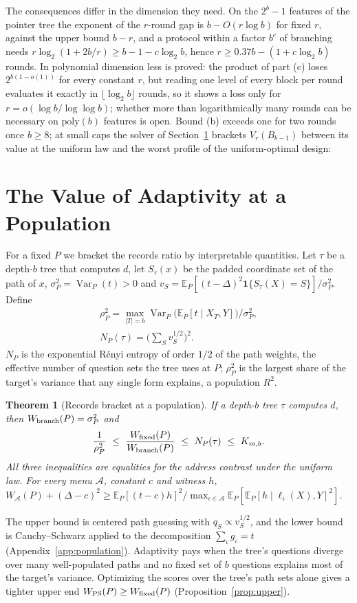 \documentclass{article}
\newtheorem{theorem}{Theorem}
\newcommand{\E}{\mathbb{E}}
\newcommand{\Var}{\operatorname{Var}}
\newcommand{\A}{\mathcal A}
\begin{document}
The consequences differ in the dimension they need. On the $2^b-1$ features of the pointer tree the exponent of the $r$-round gap is $b-O(r\log b)$ for fixed $r$, against the upper bound $b-r$, and a protocol within a factor $b^c$ of branching needs $r\log_2(1+2b/r)\ge b-1-c\log_2b$, hence $r\ge0.37b-(1+c\log_2b)$ rounds. In polynomial dimension less is proved: the product of part (c) loses $2^{b(1-o(1))}$ for every constant $r$, but reading one level of every block per round evaluates it exactly in $\lfloor\log_2b\rfloor$ rounds, so it shows a loss only for $r=o(\log b/\log\log b)$; whether more than logarithmically many rounds can be necessary on $\mathrm{poly}(b)$ features is open. Bound (b) exceeds one for two rounds once $b\ge8$; at small caps the solver of Section~\ref{sec:population} brackets $V_r(B_{b-1})$ between its value at the uniform law and the worst profile of the uniform-optimal design: \nPointerSentence{}

\section{The Value of Adaptivity at a Population}\label{sec:population}
For a fixed $P$ we bracket the records ratio by interpretable quantities. Let $\tau$ be a depth-$b$ tree that computes $d$, let $S_\tau(x)$ be the padded coordinate set of the path of $x$, $\sigma_P^2=\Var_P(t)>0$ and $v_S=\E_P[(t-\Delta)^2\mathbf 1\{S_\tau(X)=S\}]/\sigma_P^2$. Define
\begin{gather*}
 \rho_P^2=\max_{|T|=b}\Var_P\big(\E_P[t\mid X_T,Y]\big)\big/\sigma_P^2,\\
 N_P(\tau)=\Big(\sum\nolimits_Sv_S^{1/2}\Big)^2.
\end{gather*}
$N_P$ is the exponential R\'enyi entropy of order $1/2$ of the path weights, the effective number of question sets the tree uses at $P$; $\rho_P^2$ is the largest share of the target's variance that any single form explains, a population $R^2$.

\begin{theorem}[Records bracket at a population]\label{thm:bracket}
If a depth-$b$ tree $\tau$ computes $d$, then $W_{\rm branch}(P)=\sigma_P^2$ and
\[
 \frac1{\rho_P^2}\ \le\ \frac{W_{\rm fixed}(P)}{W_{\rm branch}(P)}\ \le\ N_P(\tau)\ \le\ K_{m,b}.
\]
All three inequalities are equalities for the address contrast under the uniform law. For every menu $\A$, constant $c$ and witness $h$, $W_\A(P)+(\Delta-c)^2\ge\E_P[(t-c)h]^2/\max_{\iota\in\A}\E_P[\E_P[h\mid\ell_\iota(X),Y]^2]$.
\end{theorem}
The upper bound is centered path guessing with $q_S\propto v_S^{1/2}$, and the lower bound is Cauchy--Schwarz applied to the decomposition $\sum_\iota g_\iota=t$ (Appendix~\ref{app:population}). Adaptivity pays when the tree's questions diverge over many well-populated paths and no fixed set of $b$ questions explains most of the target's variance. Optimizing the scores over the tree's path sets alone gives a tighter upper end $W_{\rm PS}(P)\ge W_{\rm fixed}(P)$ (Proposition~\ref{prop:upper}).
\end{document}
